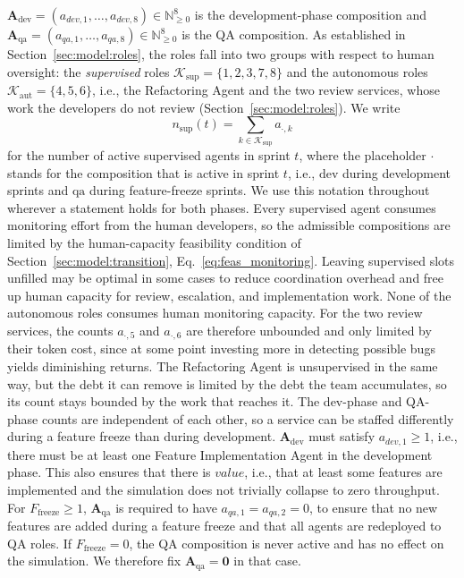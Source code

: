 \documentclass[smallextended]{svjour3}       %
\begin{document}
$\mathbf{A}_\mathrm{dev} = (a_{dev,1},\ldots,a_{dev,8}) \in \mathbb{N}_{\geq 0}^{8}$ is the
development-phase composition and $\mathbf{A}_\mathrm{qa} = (a_{qa,1},\ldots,a_{qa,8}) \in \mathbb{N}_{\geq 0}^{8}$ is the QA composition. As established in Section~\ref{sec:model:roles}, the roles fall into two groups with respect to human oversight: the \emph{supervised} roles
$\mathcal{K}_\mathrm{sup} = \{1,2,3,7,8\}$ and the autonomous roles
$\mathcal{K}_\mathrm{aut} = \{4,5,6\}$, i.e., the Refactoring Agent and the two review
services, whose work the developers do not review (Section~\ref{sec:model:roles}). We write
\begin{equation}
  n_\mathrm{sup}(t) = \sum_{k \in \mathcal{K}_\mathrm{sup}} a_{\cdot,k}
  \label{eq:nsup}
\end{equation}
for the number of active supervised agents in sprint $t$, where the placeholder $\cdot$ stands for the composition that is active in sprint $t$, i.e., $\mathrm{dev}$ during development sprints and $\mathrm{qa}$ during feature-freeze sprints. We use this notation throughout wherever a statement holds for both phases. Every supervised agent consumes monitoring effort from the human developers, so the admissible compositions are limited by the human-capacity feasibility condition of Section~\ref{sec:model:transition}, Eq.~\eqref{eq:feas_monitoring}. Leaving supervised slots unfilled may be optimal in some cases to reduce coordination overhead and free up human capacity for review, escalation, and implementation work.
None of the autonomous roles consumes human monitoring capacity. For the two review services, the counts $a_{\cdot,5}$ and $a_{\cdot,6}$ are therefore unbounded and only limited by their token cost, since at some point investing more in detecting possible bugs yields diminishing returns. The Refactoring Agent is unsupervised in the same way, but the debt it can remove is limited by the debt the team accumulates, so its count stays bounded by the work that reaches it. The dev-phase and QA-phase counts are independent of each other, so a service can be staffed differently during a feature freeze than during development.
$\mathbf{A}_\mathrm{dev}$ must satisfy $a_{dev,1} \geq 1$, i.e., there must be at least one Feature
Implementation Agent in the development phase. This also ensures that there is $value$, i.e., that at least some features are implemented and the simulation does not trivially collapse to zero throughput.
For $F_\mathrm{freeze} \geq 1$, $\mathbf{A}_\mathrm{qa}$ is required to have $a_{qa,1} = a_{qa,2} = 0$, to ensure that no new features are added during a feature freeze and that all agents are redeployed to QA roles. If $F_\mathrm{freeze}=0$, the QA composition is never active and has no effect on the simulation. We therefore fix $\mathbf{A}_\mathrm{qa} = \mathbf{0}$ in that case.
\end{document}
